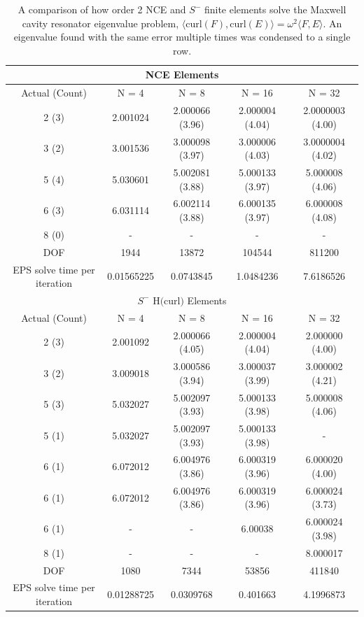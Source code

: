 \documentclass[format=acmsmall,screen,timestamp=false,a4paper]{acmart}
\begin{document}
\begin{center}
\begin{table}
\begin{tabular}{ c c c c c }
\multicolumn{5}{c}{NCE Elements} \\
\hline
Actual (Count) & N = 4 & N = 8 & N = 16 & N = 32 \\ 
\hline
2 (3) &2.001024 & 2.000066 (3.96) & 2.000004 (4.04) & 2.0000003 (4.00) \\  
3 (2) & 3.001536 & 3.000098 (3.97) & 3.000006 (4.03) & 3.0000004 (4.02) \\
5 (4) & 5.030601 & 5.002081 (3.88)& 5.000133 (3.97) & 5.000008 (4.06) \\
6 (3) & 6.031114 & 6.002114 (3.88) & 6.000135 (3.97) &  6.000008 (4.08) \\
8 (0) & - & -& - & - \\
\hline
DOF  & 1944 & 13872 & 104544 & 811200 \\
\hline
EPS solve time per iteration & 0.01565225 & 0.0743845 & 1.0484236 & 7.6186526 \\
\hline
\multicolumn{5}{c}{$S^-$ H$($curl$)$ Elements} \\
\hline
Actual (Count) & N = 4 & N = 8 & N = 16 & N = 32 \\ 
\hline
2 (3) & 2.001092 & 2.000066 (4.05) & 2.000004 (4.04) & 2.000000 (4.00) \\  
3 (2) & 3.009018 & 3.000586 (3.94) & 3.000037 (3.99) & 3.000002 (4.21) \\
5 (3) & 5.032027 & 5.002097 (3.93)& 5.000133 (3.98) & 5.000008 (4.06) \\
5 (1) & 5.032027 & 5.002097 (3.93) & 5.000133 (3.98) & - \\
6 (1) & 6.072012 & 6.004976 (3.86) & 6.000319 (3.96) & 6.000020 (4.00) \\
6 (1) & 6.072012 & 6.004976 (3.86) & 6.000319 (3.96) & 6.000024 (3.73)\\
6 (1) & - & - & 6.00038 & 6.000024 (3.98)\\
8 (1) & - & - & - & 8.000017 \\
\hline
DOF  & 1080 & 7344 & 53856 & 411840 \\
\hline
EPS solve time per iteration & 0.01288725 & 0.0309768 & 0.401663 & 4.1996873 \\
\hline

\end{tabular}
\caption{A comparison of how order 2 NCE and $S^-$ finite elements solve the Maxwell cavity resonator eigenvalue problem, $\langle \text{curl}(F), \text{curl}(E) \rangle = \omega^2 \langle F, E \rangle$. An eigenvalue found with the same error multiple times was condensed to a single row.}  
\label{tab:Eigenvalue}
\end{table}
\end{center}
\end{document}
